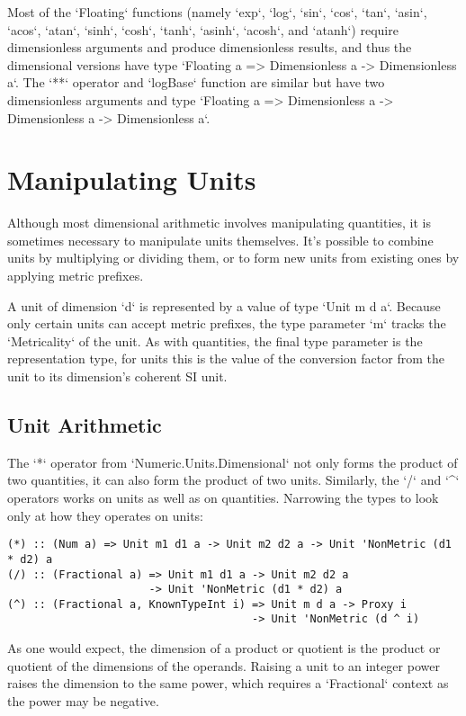 \documentclass[11pt]{report}
\begin{document}
Most of the `Floating` functions (namely `exp`, `log`, `sin`, `cos`, `tan`, `asin`, `acos`, `atan`, `sinh`, `cosh`, `tanh`, `asinh`, `acosh`, and `atanh`)
require dimensionless arguments and produce dimensionless results, and thus the dimensional versions have type `Floating a => Dimensionless a -> Dimensionless a`.
The `**` operator and `logBase` function are similar but have two dimensionless arguments and type `Floating a => Dimensionless a -> Dimensionless a -> Dimensionless a`.





\chapter{Manipulating Units}

Although most dimensional arithmetic involves manipulating quantities, it is sometimes necessary
to manipulate units themselves. It's possible to combine units by multiplying or dividing them, or to
form new units from existing ones by applying metric prefixes.

A unit of dimension `d` is represented by a value of type `Unit m d a`. Because only certain units can
accept metric prefixes, the type parameter `m` tracks the `Metricality` of the unit. As with quantities,
the final type parameter is the representation type, for units this is the value of the conversion factor
from the unit to its dimension's coherent SI unit.

\section{Unit Arithmetic}

The `*` operator from `Numeric.Units.Dimensional` not only forms the product of two quantities, it can also
form the product of two units. Similarly, the `/` and `^` operators works on units as well as on quantities.
Narrowing the types to look only at how they operates on units:

\begin{lstlisting}
(*) :: (Num a) => Unit m1 d1 a -> Unit m2 d2 a -> Unit 'NonMetric (d1 * d2) a
(/) :: (Fractional a) => Unit m1 d1 a -> Unit m2 d2 a
                      -> Unit 'NonMetric (d1 * d2) a
(^) :: (Fractional a, KnownTypeInt i) => Unit m d a -> Proxy i
                                      -> Unit 'NonMetric (d ^ i)
\end{lstlisting}

As one would expect, the dimension of a product or quotient is the product or quotient of the dimensions of the operands.
Raising a unit to an integer power raises the dimension to the same power, which requires a `Fractional` context as the
power may be negative.
\end{document}
